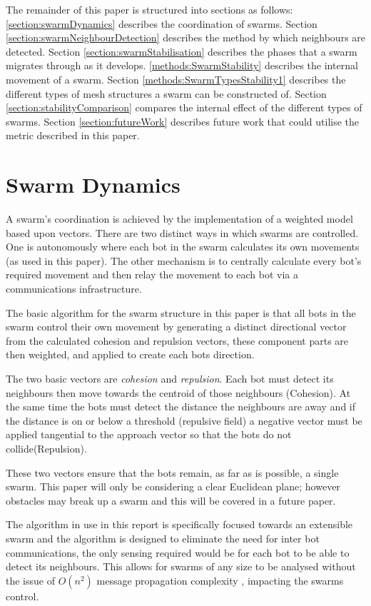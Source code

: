 \documentclass[10pt,journal,letterpaper,twoside]{IEEEtran}
\begin{document}
The remainder of this paper is structured into sections as follows:
\ref{section:swarmDynamics} describes the coordination of
swarms. Section \ref{section:swarmNeighbourDetection} describes the
method by which neighbours are detected. Section
\ref{section:swarmStabilisation} describes the phases that a swarm
migrates through as it develops. \ref{methods:SwarmStability}
describes the internal movement of a swarm. Section
\ref{methods:SwarmTypesStability1} describes the different types of
mesh structures a swarm can be constructed of. Section
\ref{section:stabilityComparison} compares the internal effect of the
different types of swarms. Section \ref{section:futureWork} describes
future work that could utilise the metric described in this paper.

\section{Swarm Dynamics\label{section:swarmDynamics}}

A swarm's coordination is achieved by the implementation of a weighted
model based upon vectors. There are two distinct ways in which swarms
are controlled. One is autonomously where each bot in the swarm
calculates its own movements (as used in this paper). The other
mechanism is to centrally calculate every bot's required movement and
then relay the movement to each bot via a communications
infrastructure.

The basic algorithm for the swarm structure in this paper is that all
bots in the swarm control their own movement by generating a distinct
directional vector from the calculated cohesion and repulsion vectors,
these component parts are then weighted, and applied to create each
bots direction.

The two basic vectors are \emph{cohesion} and \emph{repulsion}. Each
bot must detect its neighbours then move towards the centroid of those
neighbours (Cohesion). At the same time the bots must detect the
distance the neighbours are away and if the distance is on or below a
threshold (repulsive field) a negative vector must be applied
tangential to the approach vector so that the bots do not
collide(Repulsion).

These two vectors ensure that the bots remain, as far as is possible,
a single swarm. This paper will only be considering a clear Euclidean
plane; however obstacles may break up a swarm and this will be covered
in a future paper.

The algorithm in use in this report is specifically focused towards an
extensible swarm and the algorithm is designed to eliminate the need
for inter bot communications, the only sensing required would be for
each bot to be able to detect its neighbours. This allows for swarms
of any size to be analysed without the issue of $O(n^2)$ message
propagation complexity \cite{PADZMAKC09}, \cite{MJ08} impacting the
swarms control.
\end{document}
